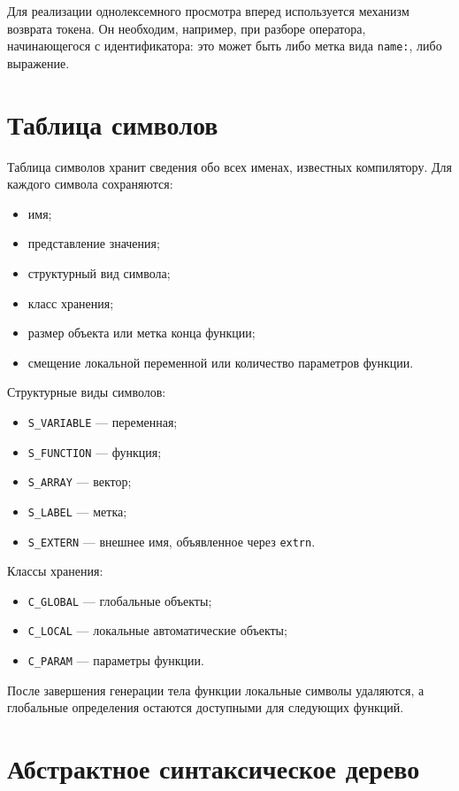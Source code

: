 Для реализации однолексемного просмотра вперед используется механизм возврата токена. Он необходим, например, при разборе оператора, начинающегося с идентификатора: это может быть либо метка вида \texttt{name:}, либо выражение.

\section{Таблица символов}

Таблица символов хранит сведения обо всех именах, известных компилятору. Для каждого символа сохраняются:

\begin{itemize}
  \item имя;
  \item представление значения;
  \item структурный вид символа;
  \item класс хранения;
  \item размер объекта или метка конца функции;
  \item смещение локальной переменной или количество параметров функции.
\end{itemize}

Структурные виды символов:

\begin{itemize}
  \item \texttt{S\_VARIABLE} --- переменная;
  \item \texttt{S\_FUNCTION} --- функция;
  \item \texttt{S\_ARRAY} --- вектор;
  \item \texttt{S\_LABEL} --- метка;
  \item \texttt{S\_EXTERN} --- внешнее имя, объявленное через \texttt{extrn}.
\end{itemize}

Классы хранения:

\begin{itemize}
  \item \texttt{C\_GLOBAL} --- глобальные объекты;
  \item \texttt{C\_LOCAL} --- локальные автоматические объекты;
  \item \texttt{C\_PARAM} --- параметры функции.
\end{itemize}

После завершения генерации тела функции локальные символы удаляются, а глобальные определения остаются доступными для следующих функций.

\section{Абстрактное синтаксическое дерево}

